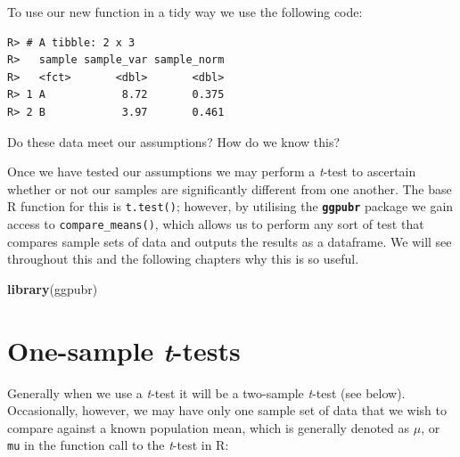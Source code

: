\documentclass[english,10pt,a4paper,oneside]{book}
\newenvironment{Shaded}{\begin{snugshade}}{\end{snugshade}}
\newcommand{\DataTypeTok}[1]{\textcolor[rgb]{0.13,0.29,0.53}{#1}}
\newcommand{\DecValTok}[1]{\textcolor[rgb]{0.00,0.00,0.81}{#1}}
\newcommand{\KeywordTok}[1]{\textcolor[rgb]{0.13,0.29,0.53}{\textbf{#1}}}
\newcommand{\NormalTok}[1]{#1}
\newcommand{\OperatorTok}[1]{\textcolor[rgb]{0.81,0.36,0.00}{\textbf{#1}}}
\newcommand{\StringTok}[1]{\textcolor[rgb]{0.31,0.60,0.02}{#1}}
\theoremstyle{definition}
\theoremstyle{definition}
\theoremstyle{definition}
\theoremstyle{remark}
\begin{document}
To use our new function in a tidy way we use the following code:

\begin{Shaded}
\end{Shaded}

\begin{verbatim}
R> # A tibble: 2 x 3
R>   sample sample_var sample_norm
R>   <fct>       <dbl>       <dbl>
R> 1 A            8.72       0.375
R> 2 B            3.97       0.461
\end{verbatim}

Do these data meet our assumptions? How do we know this?

Once we have tested our assumptions we may perform a \emph{t}-test to
ascertain whether or not our samples are significantly different from
one another. The base R function for this is \texttt{t.test()}; however,
by utilising the \textbf{\texttt{ggpubr}} package we gain access to
\texttt{compare\_means()}, which allows us to perform any sort of test
that compares sample sets of data and outputs the results as a
dataframe. We will see throughout this and the following chapters why
this is so useful.

\begin{Shaded}
\begin{Highlighting}[]
\KeywordTok{library}\NormalTok{(ggpubr)}
\end{Highlighting}
\end{Shaded}

\hypertarget{one-sample-t-tests}{%
\section{\texorpdfstring{One-sample
\emph{t}-tests}{One-sample t-tests}}\label{one-sample-t-tests}}

Generally when we use a \emph{t}-test it will be a two-sample
\emph{t}-test (see below). Occasionally, however, we may have only one
sample set of data that we wish to compare against a known population
mean, which is generally denoted as \(\mu\), or \texttt{mu} in the
function call to the \emph{t}-test in R:
\end{document}
